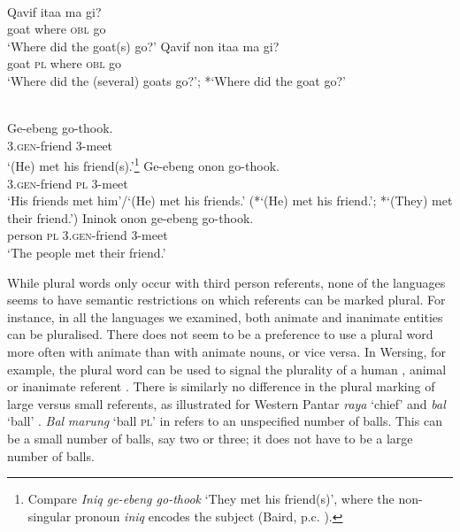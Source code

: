 \ea
{} \\
\label{bkm:Ref334184518}
\ea
\gll  Qavif ita{{\textglotstop}}{a} ma gi? \\
 goat where \textsc{obl} go \\
\glt `Where did the goat(s) go?'
\ex
\gll Qavif non ita{{\textglotstop}}a  ma gi? \\
 goat \textsc{pl} where \textsc{obl} go \\
\glt `Where did the (several) goats go?';  *`Where did the goat go?'
\z
\z

\ea\label{bkm:Ref354060976}
 \\
  \ea
  \gll Ge-ebeng go-thook. \\
  3.\textsc{gen}-friend 3-meet \\
\glt `(He) met his friend(s).'\footnote{Compare \textit{Iniq ge-ebeng go-thook} `They met his friend(s)', where the non-singular pronoun \textit{iniq} encodes the subject (Baird, p.c. ).}
  \ex
  \gll Ge-ebeng onon go-thook. \\
  3.\textsc{gen}-friend \textsc{pl} 3-meet \\
\glt `His friends met him'/`(He) met his friends.'
  (*`(He) met his friend.'; *`(They) met their friend.')
  \ex
  \gll Ininok onon ge-ebeng go-thook. \\
  person  \textsc{pl} 3.\textsc{gen}-friend 3-meet \\
\glt `The people met their friend.'
  \z
\z

While plural words only occur with third person referents, none of the languages seems to have semantic restrictions on which referents can be marked plural. For instance, in all the languages we examined, both animate and inanimate entities can be pluralised. There does not seem to be a preference to use a plural word more often with animate than with animate nouns, or vice versa. In Wersing, for example, the plural word can be used to signal the plurality of a human , animal  or inanimate referent . There is similarly no difference in the plural marking of large versus small referents, as illustrated for Western Pantar \textit{raya} `chief'  and \textit{bal} `ball' . \textit{Bal} \textit{marung} `ball \textsc{pl'} in  refers to an unspecified number of balls. This can be a small number of balls, say two or three; it does not have to be a large number of balls.




